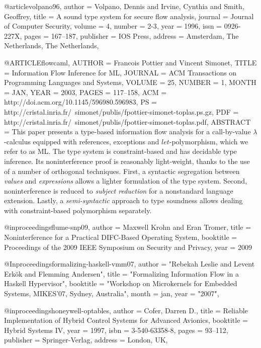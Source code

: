 @article{volpano96,
 author = {Volpano, Dennis and Irvine, Cynthia and Smith, Geoffrey},
 title = {A sound type system for secure flow analysis},
 journal = {Journal of Computer Security},
 volume = {4},
 number = {2-3},
 year = {1996},
 issn = {0926-227X},
 pages = {167--187},
 publisher = {IOS Press},
 address = {Amsterdam, The Netherlands, The Netherlands},
 }

@ARTICLE{flowcaml,
  AUTHOR = {Francois Pottier and Vincent Simonet},
  TITLE = {Information Flow Inference for {ML}},
  JOURNAL = {ACM Transactions on Programming Languages and Systems},
  VOLUME = {25},
  NUMBER = {1},
  MONTH = JAN,
  YEAR = 2003,
  PAGES = {117--158},
  ACM = {http://doi.acm.org/10.1145/596980.596983},
  PS = {http://cristal.inria.fr/~simonet/publis/fpottier-simonet-toplas.ps.gz},
  PDF = {http://cristal.inria.fr/~simonet/publis/fpottier-simonet-toplas.pdf},
  ABSTRACT = {This paper presents a type-based information flow
    analysis for a call-by-value $\lambda$-calculus equip\-ped with
    references, exceptions and $let$-polymorphism, which we refer to
    as ML. The type system is constraint-based and has decidable type
    inference. Its noninterference proof is reasonably light-weight,
    thanks to the use of a number of orthogonal techniques. First, a
    syntactic segregation between \emph{values} and \emph{expressions}
    allows a lighter formulation of the type system. Second,
    noninterference is reduced to \emph{subject reduction} for a
    nonstandard language extension. Lastly, a \emph{semi-syntactic}
    approach to type soundness allows dealing with constraint-based
    polymorphism separately.}
}

@inproceedings{flume-snp09,
 author = {Maxwell Krohn and Eran Tromer},
 title = {Noninterference for a Practical DIFC-Based Operating System},
 booktitle = {Proceedings of the 2009 {IEEE} Symposium on Security and
 Privacy},
 year = {2009}
}

@Inproceedings{formalizing-haskell-vmm07,
   author    = "Rebekah Leslie and Levent {Erk\"{o}k} and Flemming Andersen",
   title     = "Formalizing Information Flow in a {H}askell Hypervisor",
   booktitle = "Workshop on Microkernels for Embedded Systems, MIKES'07, 
                Sydney, Australia",
   month     = jan,
   year      = "2007",
}

@inproceedings{honeywell-optables,
 author = {Cofer, Darren D.},
 title = {Reliable Implementation of Hybrid Control Systems for Advanced Avionics},
 booktitle = {Hybrid Systems IV},
 year = {1997},
 isbn = {3-540-63358-8},
 pages = {93--112},
 publisher = {Springer-Verlag},
 address = {London, UK},
 }

